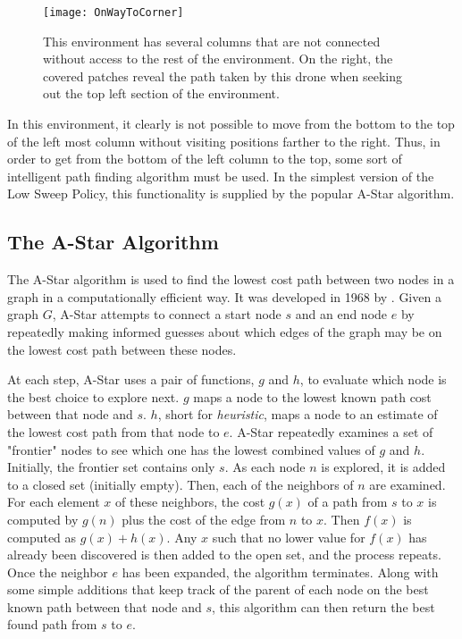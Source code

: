 \begin{figure}[H]
\texttt{[image: OnWayToCorner]}
\caption[Environment with non-continuous columns]{This environment has several columns that are not connected without access to the rest of the environment. On the right, the covered patches reveal the path taken by this drone when seeking out the top left section of the environment.}
\end{figure}

In this environment, it clearly is not possible to move from the bottom to the top of the left most column without visiting positions farther to the right. Thus, in order to get from the bottom of the left column to the top, some sort of intelligent path finding algorithm must be used. In the simplest version of the Low Sweep Policy, this functionality is supplied by the popular A-Star algorithm.

\subsection{The A-Star Algorithm}

The A-Star algorithm is used to find the lowest cost path between two nodes in a graph in a computationally efficient way. It was developed in 1968 by \citeauthor{A-Star} \cite{A-Star}. Given a graph $ G $, A-Star attempts to connect a start node $s$ and an end node $e$ by repeatedly making informed guesses about which edges of the graph may be on the lowest cost path between these nodes.

At each step, A-Star uses a pair of functions, $g$ and $h$, to evaluate which node is the best choice to explore next. $g$ maps a node to the lowest known path cost between that node and $s$. $h$, short for \textit{heuristic}, maps a node to an estimate of the lowest cost path from that node to $e$. A-Star repeatedly examines a set of "frontier" nodes to see which one has the lowest combined values of $g$ and $h$. Initially, the frontier set contains only $s$. As each node $n$ is explored, it is added to a closed set (initially empty). Then, each of the neighbors of $n$ are examined. For each element $x$ of these neighbors, the cost $g(x)$ of a path from $s$ to $x$ is computed by $g(n)$ plus the cost of the edge from $n$ to $x$. Then $f(x)$ is computed as $g(x) + h(x)$. Any $x$ such that no lower value for $f(x)$ has already been discovered is then added to the open set, and the process repeats. Once the neighbor $e$ has been expanded, the algorithm terminates. Along with some simple additions that keep track of the parent of each node on the best known path between that node and $s$, this algorithm can then return the best found path from $s$ to $e$. 

